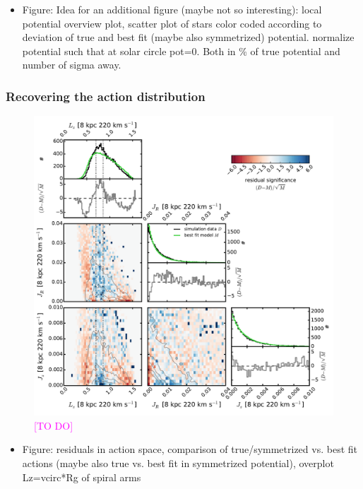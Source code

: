 \documentclass[iop,revtex4,numberedappendix,appendixfloats]{emulateapj}
\newcommand{\Wilma}[1]{\textcolor{Magenta}{#1}}
\begin{document}
\begin{itemize}
\item Figure: Idea for an additional figure (maybe not so interesting): local potential overview plot, scatter plot of stars color coded according to deviation of true and best fit (maybe also symmetrized) potential. normalize potential such that at solar circle pot=0. Both in \% of true potential and number of sigma away.
\end{itemize}

\subsubsection{Recovering the action distribution}

\begin{figure}[!htbp]
\centering
\includegraphics[width=\columnwidth]{fig/MNdHHdiffSph2_4kpc8Spiral_a_data_bestfit_residuals_only_actions.pdf}
\caption{\Wilma{[TO DO]}}
\end{figure}

\begin{itemize}
\item Figure: residuals in action space, comparison of true/symmetrized vs. best fit actions (maybe also true vs. best fit in symmetrized potential), overplot Lz=vcirc*Rg of spiral arms
\end{itemize}
\end{document}
